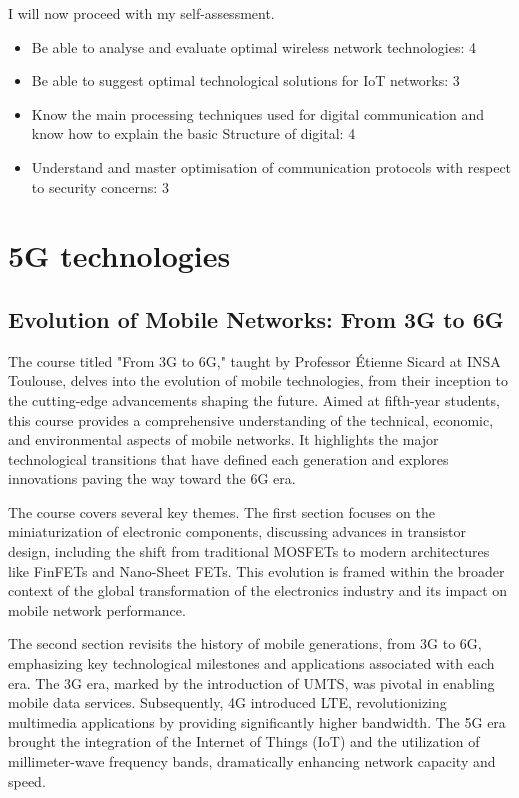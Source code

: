 I will now proceed with my self-assessment.

\begin{itemize}
    \item Be able to analyse and evaluate optimal wireless network technologies: 4
    \item Be able to suggest optimal technological solutions for IoT networks: 3
    \item Know the main processing techniques used for digital communication and know how to explain the basic Structure of digital: 4
    \item Understand and master optimisation of communication protocols with respect to security concerns: 3
\end{itemize}


\section{5G technologies}

\subsection{Evolution of Mobile Networks: From 3G to 6G}

The course titled "From 3G to 6G," taught by Professor Étienne Sicard at INSA Toulouse, delves into the evolution of mobile technologies, from their inception to the cutting-edge advancements shaping the future. Aimed at fifth-year students, this course provides a comprehensive understanding of the technical, economic, and environmental aspects of mobile networks. It highlights the major technological transitions that have defined each generation and explores innovations paving the way toward the 6G era.

The course covers several key themes. The first section focuses on the miniaturization of electronic components, discussing advances in transistor design, including the shift from traditional MOSFETs to modern architectures like FinFETs and Nano-Sheet FETs. This evolution is framed within the broader context of the global transformation of the electronics industry and its impact on mobile network performance.

The second section revisits the history of mobile generations, from 3G to 6G, emphasizing key technological milestones and applications associated with each era. The 3G era, marked by the introduction of UMTS, was pivotal in enabling mobile data services. Subsequently, 4G introduced LTE, revolutionizing multimedia applications by providing significantly higher bandwidth. The 5G era brought the integration of the Internet of Things (IoT) and the utilization of millimeter-wave frequency bands, dramatically enhancing network capacity and speed.

